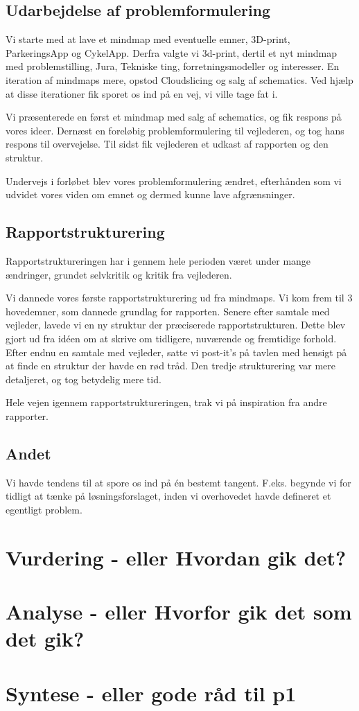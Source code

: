 \subsection{Udarbejdelse af problemformulering}

Vi starte med at lave et mindmap med eventuelle emner, 3D-print, ParkeringsApp og CykelApp. Derfra valgte vi 3d-print, dertil et nyt mindmap med problemstilling, Jura, Tekniske ting, forretningsmodeller og interesser. En iteration af mindmaps mere, opstod Cloudslicing og salg af schematics. Ved hjælp at disse iterationer fik sporet os ind på en vej, vi ville tage fat i.

Vi præsenterede en først et mindmap med salg af schematics, og fik respons på vores ideer. Dernæst en foreløbig problemformulering til vejlederen, og tog hans respons til overvejelse. Til sidst fik vejlederen et udkast af rapporten og den struktur.

Undervejs i forløbet blev vores problemformulering ændret, efterhånden som vi udvidet vores viden om emnet og dermed kunne lave afgrænsninger.


\subsection{Rapportstrukturering}


Rapportstruktureringen har i gennem hele perioden været under mange ændringer, grundet selvkritik og kritik fra vejlederen.

Vi dannede vores første rapportstrukturering ud fra mindmaps. Vi kom frem til 3 hovedemner, som dannede grundlag for rapporten. Senere efter samtale med vejleder, lavede vi en ny struktur der præciserede rapportstrukturen. Dette blev gjort ud fra idéen om at skrive om tidligere, nuværende og fremtidige forhold. Efter endnu en samtale med vejleder, satte vi post-it's på tavlen med hensigt på at finde en struktur der havde en rød tråd. Den tredje strukturering var mere detaljeret, og tog betydelig mere tid.

Hele vejen igennem rapportstruktureringen, trak vi på inspiration fra andre rapporter.

\subsection{Andet}


Vi havde tendens til at spore os ind på én bestemt tangent. F.eks. begynde vi for tidligt at tænke på løsningsforslaget, inden vi overhovedet havde defineret et egentligt problem.



\section{Vurdering - eller Hvordan gik det?}



\section{Analyse - eller Hvorfor gik det som det gik?}



\section{Syntese - eller gode råd til p1}








